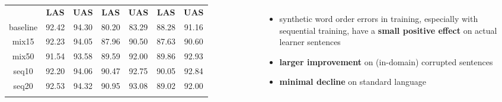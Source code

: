 \documentclass{guposter}
\begin{document}
\begin{columns}
{\begin{minipage}{\linewidth}
{\begin{tabular}{ccccccc}
                  & \textbf{LAS}                                         & \textbf{UAS}                  & \textbf{LAS}                  & \textbf{UAS}                  & \textbf{LAS}                  & \textbf{UAS}                  \\ \Xhline{2.5\arrayrulewidth}
baseline & {92.42}                         & {94.30}  & {80.20}  & {83.29}  & {88.28}  & {91.16}  \\ \Xhline{2.5\arrayrulewidth}
mix15    & 92.23                                                & 94.05                         & \cellcolor{Gray}87.96 & \cellcolor{Gray}90.50 & 87.63                         & 90.60                         \\ \hline
mix50    & \cellcolor{Gray}91.54 & \cellcolor{Gray}93.58 & \cellcolor{Gray}89.59 & \cellcolor{Gray}92.00 & 89.86                         & 92.93                         \\ \hline
seq10    & \cellcolor{Gray}92.20 & \cellcolor{Gray}94.06 & \cellcolor{Gray}90.47 & \cellcolor{Gray}92.75 & \cellcolor{Gray}90.05 & \cellcolor{Gray}92.84 \\ \hline
seq20    & 92.53                                                & 94.32                         & \cellcolor{Gray}90.95 & \cellcolor{Gray}93.08 & 89.02                         & 92.00                         \\ \Xhline{2.5\arrayrulewidth}
\end{tabular}}
\end{minipage}

\vskip 30pt
\begin{itemize}
    \item synthetic word order errors in training, especially with sequential training, have a \textbf{small positive effect} on actual learner sentences 
    \item \textbf{larger improvement} on (in-domain) corrupted sentences
    \item \textbf{minimal decline} on standard language
\end{itemize}
\vskip 40pt

}
\end{columns}
\end{document}
